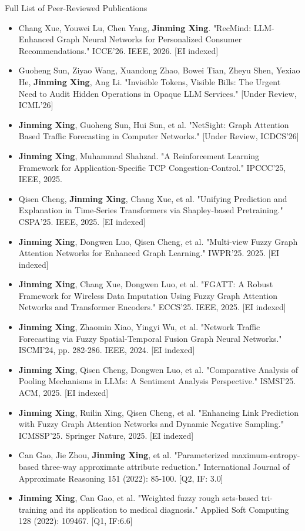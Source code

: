 \documentclass[]{mcdowellcv}
\begin{document}
\begin{cvsection}{Full List of Peer-Reviewed Publications}
    \begin{cvsubsection}{}{}{}
        \begin{itemize}
            \item Chang Xue, Youwei Lu, Chen Yang, \textbf{Jinming Xing}. "RecMind: LLM-Enhanced Graph Neural Networks for Personalized Consumer Recommendations." ICCE'26. IEEE, 2026. [EI indexed]
            \item Guoheng Sun, Ziyao Wang, Xuandong Zhao, Bowei Tian, Zheyu Shen, Yexiao He, \textbf{Jinming Xing}, Ang Li. "Invisible Tokens, Visible Bills: The Urgent Need to Audit Hidden Operations in Opaque LLM Services." [Under Review, ICML'26]
            \item \textbf{Jinming Xing}, Guoheng Sun, Hui Sun, et al. "NetSight: Graph Attention Based Traffic Forecasting in Computer Networks." [Under Review, ICDCS'26]
            \item \textbf{Jinming Xing}, Muhammad Shahzad. "A Reinforcement Learning Framework for Application-Specific TCP Congestion-Control." IPCCC'25, IEEE, 2025.
            \item Qisen Cheng, \textbf{Jinming Xing}, Chang Xue, et al. "Unifying Prediction and Explanation in Time-Series Transformers via Shapley-based Pretraining." CSPA'25. IEEE, 2025. [EI indexed]
            \item \textbf{Jinming Xing}, Dongwen Luo, Qisen Cheng, et al. "Multi-view Fuzzy Graph Attention Networks for Enhanced Graph Learning." IWPR'25. 2025. [EI indexed]
            \item \textbf{Jinming Xing}, Chang Xue, Dongwen Luo, et al. "FGATT: A Robust Framework for Wireless Data Imputation Using Fuzzy Graph Attention Networks and Transformer Encoders." ECCS'25. IEEE, 2025. [EI indexed]
            \item \textbf{Jinming Xing}, Zhaomin Xiao, Yingyi Wu, et al. "Network Traffic Forecasting via Fuzzy Spatial-Temporal Fusion Graph Neural Networks." ISCMI'24, pp. 282-286. IEEE, 2024. [EI indexed]
            \item \textbf{Jinming Xing}, Qisen Cheng, Dongwen Luo, et al. "Comparative Analysis of Pooling Mechanisms in LLMs: A Sentiment Analysis Perspective." ISMSI'25. ACM, 2025. [EI indexed]
            \item \textbf{Jinming Xing}, Ruilin Xing, Qisen Cheng, et al. "Enhancing Link Prediction with Fuzzy Graph Attention Networks and Dynamic Negative Sampling." ICMSSP'25. Springer Nature, 2025. [EI indexed]
            \item Can Gao, Jie Zhou, \textbf{Jinming Xing}, et al. "Parameterized maximum-entropy-based three-way approximate attribute reduction." International Journal of Approximate Reasoning 151 (2022): 85-100. [Q2, IF: 3.0]
            \item \textbf{Jinming Xing}, Can Gao, et al. "Weighted fuzzy rough sets-based tri-training and its application to medical diagnosis." Applied Soft Computing 128 (2022): 109467. [Q1, IF:6.6]
        \end{itemize}
    \end{cvsubsection}
\end{cvsection}
\end{document}
